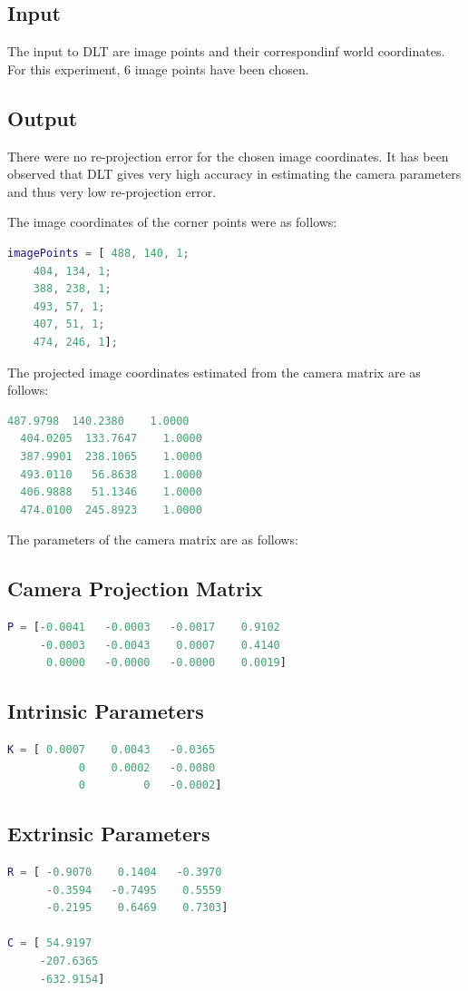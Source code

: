 \documentclass[12pt]{article}
\begin{document}
\subsection{Input}
The input to DLT are image points and their correspondinf world coordinates. For this experiment, 6 image points have been chosen.

\subsection{Output}
There were no re-projection error for the chosen image coordinates. It has been observed that DLT gives very high accuracy in estimating the camera parameters and thus very low re-projection error. 

The image coordinates of the corner points were as follows:
\begin{lstlisting}[language=matlab]
 imagePoints = [ 488, 140, 1;
    404, 134, 1;
    388, 238, 1;
    493, 57, 1;
    407, 51, 1;
    474, 246, 1];
\end{lstlisting}
The projected image coordinates estimated from the camera matrix are as follows:
\begin{lstlisting}[language=matlab]
  487.9798  140.2380    1.0000
  404.0205  133.7647    1.0000
  387.9901  238.1065    1.0000
  493.0110   56.8638    1.0000
  406.9888   51.1346    1.0000
  474.0100  245.8923    1.0000
\end{lstlisting}

The parameters of the camera matrix are as follows:
\subsection{Camera Projection Matrix} 
\begin{lstlisting}[language=matlab]
P = [-0.0041   -0.0003   -0.0017    0.9102
     -0.0003   -0.0043    0.0007    0.4140
      0.0000   -0.0000   -0.0000    0.0019]
\end{lstlisting}
\subsection{Intrinsic Parameters}
\begin{lstlisting}[language=matlab]
K = [ 0.0007    0.0043   -0.0365
           0    0.0002   -0.0080
           0         0   -0.0002]
\end{lstlisting}
\subsection{Extrinsic Parameters}
\begin{lstlisting}[language=matlab]
R = [ -0.9070    0.1404   -0.3970
      -0.3594   -0.7495    0.5559
      -0.2195    0.6469    0.7303]
      
C = [ 54.9197
     -207.6365
     -632.9154]
\end{lstlisting}
\end{document}
